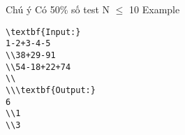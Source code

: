 Chú ý
Có 50\% số test N  $\le$  10
Example
\begin{verbatim}
\textbf{Input:}
1-2+3-4-5
\\38+29-91
\\54-18+22+74
\\
\\\textbf{Output:}
6
\\1
\\3 \end{verbatim}